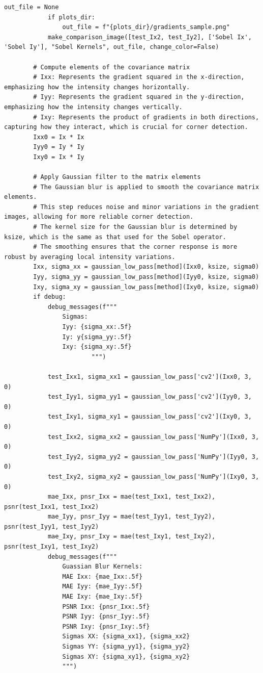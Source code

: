 \documentclass[11pt, conference, letterpaper]{IEEEtran}
\begin{document}
\begin{lstlisting}[style=python, caption={\texttt{shi\_tomasi\_corners.py}}, label={lst:stc}]
            out_file = None
            if plots_dir:
                out_file = f"{plots_dir}/gradients_sample.png"
            make_comparison_image([test_Ix2, test_Iy2], ['Sobel Ix', 'Sobel Iy'], "Sobel Kernels", out_file, change_color=False)
            
        # Compute elements of the covariance matrix
        # Ixx: Represents the gradient squared in the x-direction, emphasizing how the intensity changes horizontally.
        # Iyy: Represents the gradient squared in the y-direction, emphasizing how the intensity changes vertically.
        # Ixy: Represents the product of gradients in both directions, capturing how they interact, which is crucial for corner detection.
        Ixx0 = Ix * Ix
        Iyy0 = Iy * Iy
        Ixy0 = Ix * Iy
    
        # Apply Gaussian filter to the matrix elements
        # The Gaussian blur is applied to smooth the covariance matrix elements. 
        # This step reduces noise and minor variations in the gradient images, allowing for more reliable corner detection. 
        # The kernel size for the Gaussian blur is determined by ksize, which is the same as that used for the Sobel operator. 
        # The smoothing ensures that the corner response is more robust by averaging local intensity variations.
        Ixx, sigma_xx = gaussian_low_pass[method](Ixx0, ksize, sigma0)
        Iyy, sigma_yy = gaussian_low_pass[method](Iyy0, ksize, sigma0)
        Ixy, sigma_xy = gaussian_low_pass[method](Ixy0, ksize, sigma0)
        if debug:
            debug_messages(f"""
                Sigmas: 
                Iyy: {sigma_xx:.5f}
                Iy: y{sigma_yy:.5f}
                Ixy: {sigma_xy:.5f}
                        """)
     
            test_Ixx1, sigma_xx1 = gaussian_low_pass['cv2'](Ixx0, 3, 0)
            test_Iyy1, sigma_yy1 = gaussian_low_pass['cv2'](Iyy0, 3, 0)
            test_Ixy1, sigma_xy1 = gaussian_low_pass['cv2'](Ixy0, 3, 0)
            test_Ixx2, sigma_xx2 = gaussian_low_pass['NumPy'](Ixx0, 3, 0)
            test_Iyy2, sigma_yy2 = gaussian_low_pass['NumPy'](Iyy0, 3, 0)
            test_Ixy2, sigma_xy2 = gaussian_low_pass['NumPy'](Ixy0, 3, 0)
            mae_Ixx, pnsr_Ixx = mae(test_Ixx1, test_Ixx2), psnr(test_Ixx1, test_Ixx2)
            mae_Iyy, pnsr_Iyy = mae(test_Iyy1, test_Iyy2), psnr(test_Iyy1, test_Iyy2)
            mae_Ixy, pnsr_Ixy = mae(test_Ixy1, test_Ixy2), psnr(test_Ixy1, test_Ixy2)
            debug_messages(f"""
                Guassian Blur Kernels:
                MAE Ixx: {mae_Ixx:.5f}
                MAE Iyy: {mae_Iyy:.5f}
                MAE Ixy: {mae_Ixy:.5f}
                PSNR Ixx: {pnsr_Ixx:.5f}
                PSNR Iyy: {pnsr_Iyy:.5f}
                PSNR Ixy: {pnsr_Ixy:.5f}
                Sigmas XX: {sigma_xx1}, {sigma_xx2}
                Sigmas YY: {sigma_yy1}, {sigma_yy2}
                Sigmas XY: {sigma_xy1}, {sigma_xy2}
                """)
    

\end{lstlisting}
\end{document}
